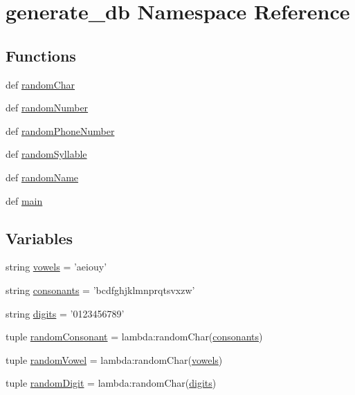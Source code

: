\hypertarget{namespacegenerate__db}{
\section{generate\_\-db Namespace Reference}
\label{namespacegenerate__db}
}
\subsection*{Functions}
\begin{CompactItemize}
\item 
def \hyperlink{namespacegenerate__db_eadd9c3802da642d0ce75635f4541cd2}{randomChar}
\item 
def \hyperlink{namespacegenerate__db_30086626c62e40f2983024f5d68e718e}{randomNumber}
\item 
def \hyperlink{namespacegenerate__db_d0786a358625e83c545ab36b0ef523aa}{randomPhoneNumber}
\item 
def \hyperlink{namespacegenerate__db_a879a1152e7cdd1180bcbe74c9de624a}{randomSyllable}
\item 
def \hyperlink{namespacegenerate__db_5a79efa0019ee6a80d9b806adbfb2105}{randomName}
\item 
def \hyperlink{namespacegenerate__db_9cd177ba24ef31178b1e8769ea59a00c}{main}
\end{CompactItemize}
\subsection*{Variables}
\begin{CompactItemize}
\item 
string \hyperlink{namespacegenerate__db_2a77dc9ebcadb6fc6e8dbf64b04ad056}{vowels} = 'aeiouy'
\item 
string \hyperlink{namespacegenerate__db_f595dc1a1f93187bf83045c7811adab2}{consonants} = 'bcdfghjklmnprqtsvxzw'
\item 
string \hyperlink{namespacegenerate__db_1e0c49b7b44537be906cbfca51cb8543}{digits} = '0123456789'
\item 
tuple \hyperlink{namespacegenerate__db_0e0c66e62d599846a54ee0851e25fb4c}{randomConsonant} = lambda:randomChar(\hyperlink{namespacegenerate__db_f595dc1a1f93187bf83045c7811adab2}{consonants})
\item 
tuple \hyperlink{namespacegenerate__db_4a5db14b18a9dc595918342e30ad4348}{randomVowel} = lambda:randomChar(\hyperlink{namespacegenerate__db_2a77dc9ebcadb6fc6e8dbf64b04ad056}{vowels})
\item 
tuple \hyperlink{namespacegenerate__db_4bff979411d2ede7c995cef5b6985702}{randomDigit} = lambda:randomChar(\hyperlink{namespacegenerate__db_1e0c49b7b44537be906cbfca51cb8543}{digits})
\end{CompactItemize}


